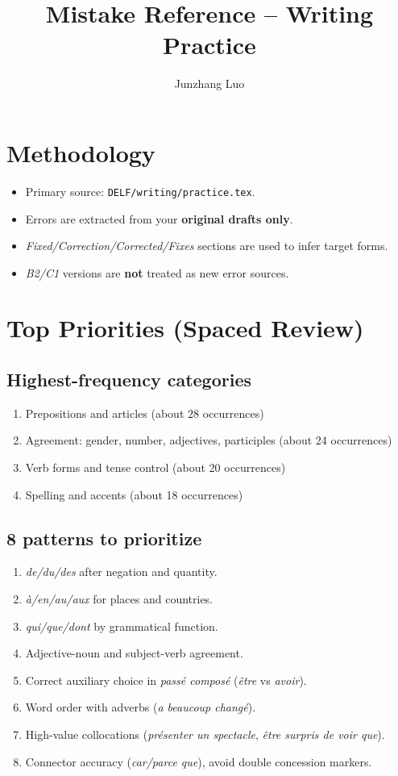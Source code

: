 \documentclass{article}
\title{Mistake Reference -- Writing Practice}
\author{Junzhang Luo}
\date{}
\begin{document}
\maketitle
\tableofcontents

\section{Methodology}
\begin{itemize}
    \item Primary source: \texttt{DELF/writing/practice.tex}.
    \item Errors are extracted from your \textbf{original drafts only}.
    \item \textit{Fixed/Correction/Corrected/Fixes} sections are used to infer target forms.
    \item \textit{B2/C1} versions are \textbf{not} treated as new error sources.
\end{itemize}

\section{Top Priorities (Spaced Review)}
\subsection*{Highest-frequency categories}
\begin{enumerate}
    \item Prepositions and articles (about 28 occurrences)
    \item Agreement: gender, number, adjectives, participles (about 24 occurrences)
    \item Verb forms and tense control (about 20 occurrences)
    \item Spelling and accents (about 18 occurrences)
\end{enumerate}

\subsection*{8 patterns to prioritize}
\begin{enumerate}
    \item \textit{de/du/des} after negation and quantity.
    \item \textit{à/en/au/aux} for places and countries.
    \item \textit{qui/que/dont} by grammatical function.
    \item Adjective-noun and subject-verb agreement.
    \item Correct auxiliary choice in \textit{passé composé} (\textit{être} vs \textit{avoir}).
    \item Word order with adverbs (\textit{a beaucoup changé}).
    \item High-value collocations (\textit{présenter un spectacle}, \textit{être surpris de voir que}).
    \item Connector accuracy (\textit{car/parce que}), avoid double concession markers.
\end{enumerate}
\end{document}
